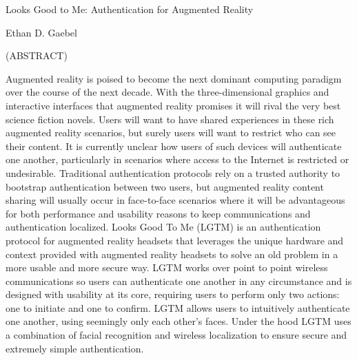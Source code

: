 \documentclass[12pt]{report}
\begin{document}
\thispagestyle{empty}
\begin{center}

{\large Looks Good to Me: 
Authentication for Augmented Reality}

\vfill

Ethan D. Gaebel

\vfill

(ABSTRACT)


Augmented reality is poised to become the next dominant computing paradigm over the course of the next decade. With the three-dimensional graphics and interactive interfaces that augmented reality promises it will rival the very best science fiction novels. Users will want to have shared experiences in these rich augmented reality scenarios, but surely users will want to restrict who can see their content. It is currently unclear how users of such devices will authenticate one another, particularly in scenarios where access to the Internet is restricted or undesirable. Traditional authentication protocols rely on a trusted authority to bootstrap authentication between two users, but augmented reality content sharing will usually occur in face-to-face scenarios where it will be advantageous for both performance and usability reasons to keep communications and authentication localized. Looks Good To Me (LGTM) is an authentication protocol for augmented reality headsets that leverages the unique hardware and context provided with augmented reality headsets to solve an old problem in a more usable and more secure way. LGTM works over point to point wireless communications so users can authenticate one another in any circumstance and is designed with usability at its core, requiring users to perform only two actions: one to initiate and one to confirm. LGTM allows users to intuitively authenticate one another, using seemingly only each other's faces. Under the hood LGTM uses a combination of facial recognition and wireless localization to ensure secure and extremely simple authentication.

\vfill

\end{center}
\end{document}

